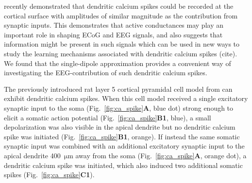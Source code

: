 \documentclass[preprint,10pt,authoryear]{elsarticle}
\begin{document}
\cite{SUZUKI2017} recently demonstrated that dendritic calcium spikes could be recorded at the cortical surface with amplitudes of similar magnitude as the contribution from synaptic inputs. This demonstrates that active conductances may play an important role in shaping ECoG and EEG signals, and also suggests that information might be present in such signals which can be used in new ways to study the learning mechanisms associated with dendritic calcium spikes (cite). We found that the single-dipole approximation provides a convenient way of investigating the EEG-contribution of such dendritic calcium spikes.

The previously introduced rat layer 5 cortical pyramidal cell model from \cite{HAY2011} can exhibit dendritic calcium spikes.
When this cell model received a single excitatory synaptic input to the soma (Fig.~\ref{fig:ca_spike}\textbf{A}, blue dot) strong enough to elicit a somatic action potential (Fig.~\ref{fig:ca_spike}\textbf{B1}, blue), a small depolarization was also visible in the apical dendrite but no dendritic calcium spike was initiated (Fig.~\ref{fig:ca_spike}\textbf{B1}, orange). If instead the same somatic synaptic input was combined with an additional excitatory synaptic input to the apical dendrite 400~$\si{\um}$ away from the soma (Fig.~\ref{fig:ca_spike}\textbf{A}, orange dot), a dendritic calcium spike was initiated, which also induced two additional somatic spikes (Fig.~\ref{fig:ca_spike}\textbf{C1}).
\end{document}

